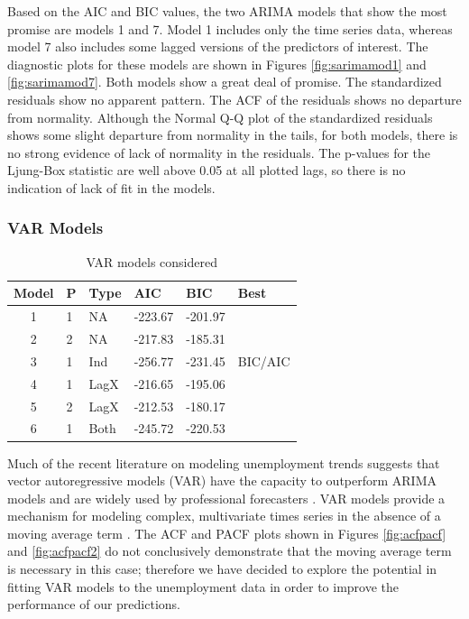 \documentclass[twoside,twocolumn]{article}
\begin{document}
		Based on the AIC and BIC values, the two ARIMA models that show the most promise are models 1 and 7.  Model 1 includes only the time series data, whereas model 7 also includes some lagged versions of the predictors of interest.  The diagnostic plots for these models are shown in Figures \ref{fig:sarimamod1} and \ref{fig:sarimamod7}. Both models show a great deal of promise.  The standardized residuals show no apparent pattern. The ACF of the residuals shows no departure from normality. Although the Normal Q-Q plot of the standardized residuals shows some slight departure from normality in the tails, for both models, there is no strong evidence of lack of normality in the residuals.  The p-values for the  Ljung-Box statistic are well above 0.05 at all plotted lags, so there is no indication of lack of fit in the models.


      \subsubsection{VAR Models}
\begin{table}[htb]
\centering
\caption{VAR models considered}
\label{tab:varchoices}
\begin{tabular}{clllll}
  \hline
 Model & P & Type &  AIC & BIC & Best \\
  \hline
1  & 1 & NA  &  -223.67 & -201.97 &  \\
  2  & 2 & NA  &   -217.83 & -185.31 &  \\
  3  & 1 & Ind  & -256.77 & -231.45 & BIC/AIC \\
  4  & 1 & LagX & -216.65 & -195.06 &  \\
  5  & 2 & LagX & -212.53 & -180.17 &  \\
  6  & 1 & Both  & -245.72 & -220.53 &  \\
   \hline
\end{tabular}
\end{table}



     Much of the recent literature on modeling unemployment trends suggests that vector autoregressive models (VAR) have the capacity to outperform ARIMA models and are widely used by professional forecasters \citep{Meyer2015, Tasci2015, Barnichon2016}. VAR models provide a mechanism for modeling complex, multivariate times series in the absence of a moving average term \citep{Chatfield2001} . The ACF and PACF plots shown in Figures \ref{fig:acfpacf} and \ref{fig:acfpacf2} do not conclusively demonstrate that the moving average term is necessary in this case; therefore we have decided to explore the potential in fitting VAR models to the unemployment data in order to improve the performance of our predictions.
\end{document}
